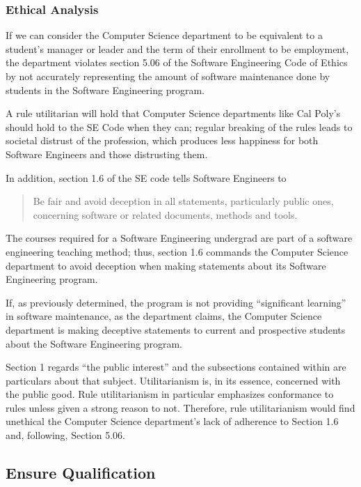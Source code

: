 \documentclass[11pt]{article}
\begin{document}
\begin{multicols}{2}
\subsubsection{Ethical Analysis}

If we can consider the Computer Science department to be equivalent to a student's manager or leader and the term of their enrollment to be employment, the department violates section 5.06 of the Software Engineering Code of Ethics by not accurately representing the amount of software maintenance done by students in the Software Engineering program.

A rule utilitarian will hold that Computer Science departments like Cal Poly's should hold to the SE Code when they can; regular breaking of the rules leads to societal distrust of the profession, which produces less happiness for both Software Engineers and those distrusting them.

In addition, section 1.6 of the SE code tells Software Engineers to

\begin{quote}
Be fair and avoid deception in all statements, particularly public ones, concerning software or related documents, methods and tools. \cite{secode}
\end{quote}

The courses required for a Software Engineering undergrad are part of a software engineering teaching method; thus, section 1.6 commands the Computer Science department to avoid deception when making statements about its Software Engineering program.

If, as previously determined, the program is not providing ``significant learning'' in software maintenance, as the department claims, the Computer Science department is making deceptive statements to current and prospective students about the Software Engineering program.

Section 1 regards ``the public interest'' and the subsections contained within are particulars about that subject. \cite{secode}  Utilitarianism is, in its essence, concerned with the public good.  Rule utilitarianism in particular emphasizes conformance to rules unless given a strong reason to not.  Therefore, rule utilitarianism would find unethical the Computer Science department's lack of adherence to Section 1.6 and, following, Section 5.06.


\subsection{Ensure Qualification}


\end{multicols}
\end{document}
